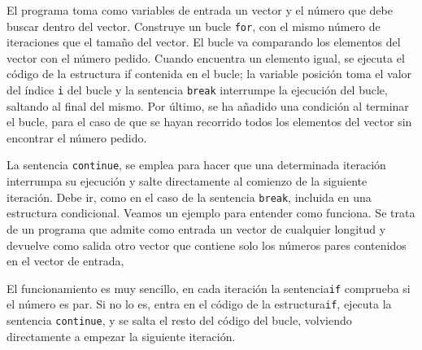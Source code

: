 
El programa toma como variables de entrada un vector y el número que debe buscar dentro del vector. Construye un bucle \texttt{for}, con el mismo número de iteraciones que el tamaño del vector. El bucle va comparando los elementos del vector con el número pedido. Cuando encuentra un elemento igual, se ejecuta el código de la estructura if contenida en el bucle; la variable posición toma el valor del índice \texttt{i} del bucle y la sentencia \texttt{break} interrumpe la ejecución del bucle, saltando al final del mismo. Por último, se ha añadido una condición al terminar el bucle, para el caso de que se hayan recorrido todos los elementos del vector sin encontrar el número pedido.

La sentencia \texttt{continue}, se emplea para hacer que una determinada iteración interrumpa su ejecución y salte directamente al comienzo de la siguiente iteración. Debe ir, como en el caso de la sentencia \texttt{break}, incluida en una estructura condicional. Veamos un ejemplo para entender como funciona. Se trata de un programa que admite como entrada un vector de cualquier longitud y devuelve como salida otro vector que contiene solo los números pares contenidos en el vector de entrada,



El funcionamiento es muy sencillo, en cada iteración la sentencia\texttt{if} comprueba si el número es par. Si no lo es, entra en el código de la estructura\texttt{if}, ejecuta la sentencia \texttt{continue}, y se salta el resto del código del bucle, volviendo directamente a empezar la siguiente iteración.

